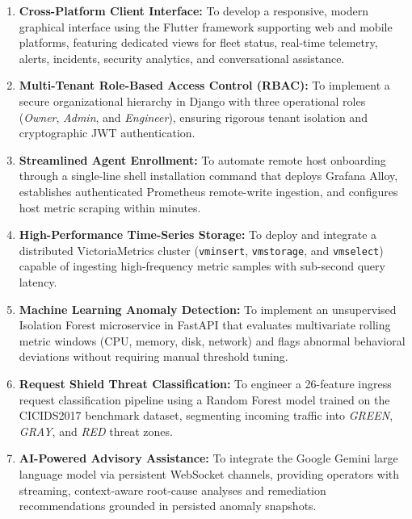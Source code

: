 \begin{enumerate}
  \item \textbf{Cross-Platform Client Interface:} To develop a responsive, modern graphical interface using the Flutter framework supporting web and mobile platforms, featuring dedicated views for fleet status, real-time telemetry, alerts, incidents, security analytics, and conversational assistance.
  
  \item \textbf{Multi-Tenant Role-Based Access Control (RBAC):} To implement a secure organizational hierarchy in Django with three operational roles (\textit{Owner}, \textit{Admin}, and \textit{Engineer}), ensuring rigorous tenant isolation and cryptographic JWT authentication.
  
  \item \textbf{Streamlined Agent Enrollment:} To automate remote host onboarding through a single-line shell installation command that deploys Grafana Alloy, establishes authenticated Prometheus remote-write ingestion, and configures host metric scraping within minutes.
  
  \item \textbf{High-Performance Time-Series Storage:} To deploy and integrate a distributed VictoriaMetrics cluster (\texttt{vminsert}, \texttt{vmstorage}, and \texttt{vmselect}) capable of ingesting high-frequency metric samples with sub-second query latency.
  
  \item \textbf{Machine Learning Anomaly Detection:} To implement an unsupervised Isolation Forest microservice in FastAPI that evaluates multivariate rolling metric windows (CPU, memory, disk, network) and flags abnormal behavioral deviations without requiring manual threshold tuning.
  
  \item \textbf{Request Shield Threat Classification:} To engineer a 26-feature ingress request classification pipeline using a Random Forest model trained on the CICIDS2017 benchmark dataset, segmenting incoming traffic into \textit{GREEN}, \textit{GRAY}, and \textit{RED} threat zones.
  
  \item \textbf{AI-Powered Advisory Assistance:} To integrate the Google Gemini large language model via persistent WebSocket channels, providing operators with streaming, context-aware root-cause analyses and remediation recommendations grounded in persisted anomaly snapshots.
\end{enumerate}

